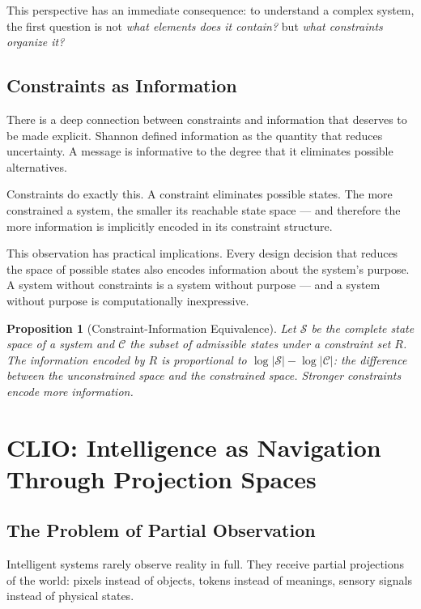\documentclass[11pt, a4paper]{article}
\theoremstyle{named}
\newtheorem{proposition}{Proposition}
\begin{document}
This perspective has an immediate consequence: to understand a complex
system, the first question is not \emph{what elements does it contain?}
but \emph{what constraints organize it?}

\subsection{Constraints as Information}

There is a deep connection between constraints and information that
deserves to be made explicit. Shannon defined information as the
quantity that reduces uncertainty. A message is informative to the
degree that it eliminates possible alternatives.

Constraints do exactly this. A constraint eliminates possible states.
The more constrained a system, the smaller its reachable state space
--- and therefore the more information is implicitly encoded in its
constraint structure.

This observation has practical implications. Every design decision
that reduces the space of possible states also encodes information
about the system's purpose. A system without constraints is a system
without purpose --- and a system without purpose is computationally
inexpressive.

\begin{proposition}[Constraint-Information Equivalence]
Let $\mathcal{S}$ be the complete state space of a system and
$\mathcal{C}$ the subset of admissible states under a constraint set
$R$. The information encoded by $R$ is proportional to
$\log |\mathcal{S}| - \log |\mathcal{C}|$: the difference between
the unconstrained space and the constrained space. Stronger constraints
encode more information.
\end{proposition}

\section{CLIO: Intelligence as Navigation Through Projection Spaces}

\subsection{The Problem of Partial Observation}

Intelligent systems rarely observe reality in full. They receive
partial projections of the world: pixels instead of objects, tokens
instead of meanings, sensory signals instead of physical states.
\end{document}
